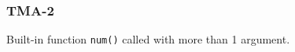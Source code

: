 \subsubsection{TMA-2}\label{sec:error_code_tma_2}

Built-in function \texttt{num()} called with more than 1 argument.


